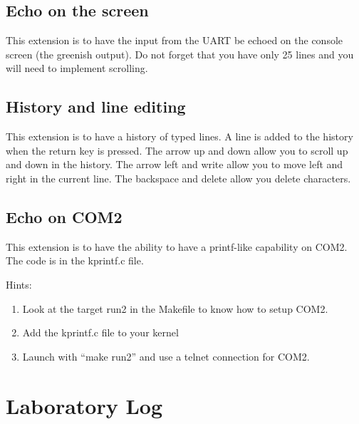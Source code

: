 \documentclass[10]{article}
\begin{document}
\subsection{Echo on the screen}

This extension is to have the input from the UART be 
echoed on the console screen (the greenish output).
Do not forget that you have only 25 lines and you will
need to implement scrolling.

\subsection{History and line editing}

This extension is to have a history of typed lines.
A line is added to the history when the return key is pressed.
The arrow up and down allow you to scroll up and down in the history.
The arrow left and write allow you to move left and right in the current line.
The backspace and delete allow you delete characters.

\subsection{Echo on COM2}

This extension is to have the ability to have a printf-like 
capability on COM2. The code is in the kprintf.c file.

\noindent Hints: 
\begin{enumerate}
\item 
Look at the target run2 in the Makefile to know how
to setup COM2.
\item
Add the kprintf.c file to your kernel
\item
Launch with ``make run2'' and use a telnet connection
for COM2.
\end{enumerate}


\section{Laboratory Log}
\end{document}
